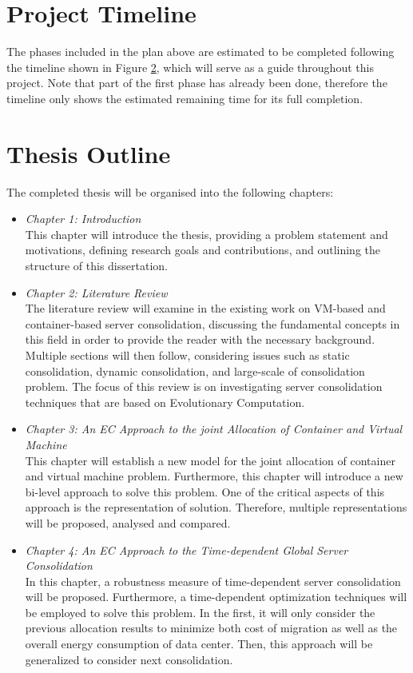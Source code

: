 \section{Project Timeline}
The phases included in the plan above are estimated to be completed following the timeline
shown in Figure \ref{}, which will serve as a guide throughout this project. Note that part of the first phase has already been done, therefore the timeline only shows the estimated remaining time for its full completion.

\section{Thesis Outline}
The completed thesis will be organised into the following chapters:
\begin{itemize}
	\item \textit{Chapter 1: Introduction} \\
	This chapter will introduce the thesis, providing a problem statement and motivations, defining research goals and contributions, and outlining the structure of this dissertation.
	\item \textit{Chapter 2: Literature Review} \\
	The literature review will examine in the existing work on VM-based and container-based server consolidation, discussing the fundamental concepts in this field in order to provide the reader with the necessary background. Multiple sections will then follow, 
	considering issues such as static consolidation, dynamic consolidation, and large-scale of consolidation problem. The focus of this review is on investigating server consolidation techniques that are based on Evolutionary Computation.
	\item \textit{Chapter 3: An EC Approach to the joint Allocation of Container and Virtual Machine} \\
	This chapter will establish a new model for the joint allocation of container and virtual machine problem. Furthermore, this chapter will introduce a new bi-level approach to solve this problem. One of the critical aspects of this approach is the representation of solution. Therefore, multiple representations will be proposed, analysed and compared.
	\item \textit{Chapter 4: An EC Approach to the Time-dependent Global Server Consolidation} \\
	In this chapter, a robustness measure of time-dependent server consolidation will be proposed. Furthermore, a time-dependent optimization techniques will be employed to solve this problem. In the first, it will only consider the previous allocation results to minimize both cost of migration as well as the overall energy consumption of data center. Then, this approach will be generalized to consider next consolidation.

\end{itemize}
